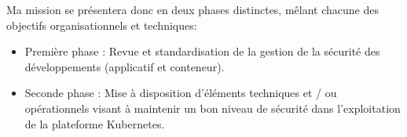 Ma mission se présentera donc en deux phases distinctes, mêlant chacune des objectifs organisationnels et techniques:
\begin{itemize}
    \item \textmd{Première phase :} Revue et standardisation de la gestion de la sécurité des développements (applicatif et 
    conteneur).
    \item Seconde phase : Mise à disposition d'éléments techniques et / ou opérationnels visant à maintenir un bon 
    niveau de sécurité dans l'exploitation de la plateforme Kubernetes. 
\end{itemize}

